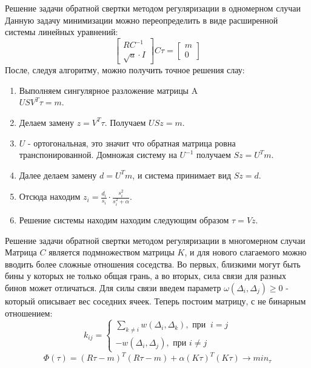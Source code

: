 \documentclass[fullscreen=true,russian,compress,%
	hyperref={unicode,bookmarks=false}]{presentation}
\begin{document}
\begin{frame}{Решение задачи обратной свертки методом регуляризации в одномерном случаи}
Данную задачу минимизации можно переопределить в виде расширенной системы линейных уравнений:
\begin{equation}
       \begin{bmatrix}
           RC^{-1} \\
           \sqrt{a} \cdot I
       \end{bmatrix}
       C\tau = 
       \begin{bmatrix}
           m \\
           0
       \end{bmatrix}
       \label{system_one_dim}
   \end{equation}
После, следуя алгоритму, можно получить точное решения слау:
\begin{enumerate}
    \item Выполняем сингулярное разложение матрицы A \\
    $USV^T \tau = m.$
    \item Делаем замену $z = V^T\tau$. Получаем $USz = m.$
    \item $U$ - ортогональная, это значит что обратная матрица ровна транспонированной. Домножая систему на $U^{-1}$ получаем $Sz=U^Tm$.
    \item Далее делаем замену $d=U^Tm$, и система принимает вид $Sz=d$.
    \item Отсюда находим $z_{i} = \frac{d_{i}}{s_{i}} \cdot \frac{s^2_{i}}{s^2_{i} + \alpha}$.
    \item Решение системы находим находим следующим образом $\tau = Vz$.
\end{enumerate}
\end{frame}


\begin{frame}{Решение задачи обратной свертки методом регуляризации в многомерном случаи}
   Матрица $C$ является подмножеством матрицы $K$, и для нового слагаемого можно вводить более сложные
   отношения соседства. Во первых, близкими могут быть бины у которых не только общая грань, а во вторых, сила связи для разных бинов
   может отличаться. Для силы связи введем параметр $\omega(\Delta_{i}, \Delta_{j}) \geq 0$ - который описывает вес соседних ячеек. 
   Теперь постоим матрицу, с не бинарным отношением:
   \begin{equation}
    k_{ij} =
     \begin{cases}
       \displaystyle\sum_{k\neq i} w(\Delta_{i}, \Delta_{k}), \text{ при } \ i = j \\
       -w( \Delta_{i}, \Delta_{j} ), \text{ при } i \neq j
     \end{cases}
   \end{equation}
   \begin{equation}
      \Phi(\tau)=(R\tau-m)^T (R\tau-m) + \alpha(K\tau)^T(K\tau) \to min_{\tau}
      \label{min_n_dim}
   \end{equation}
\end{frame}
\end{document}
